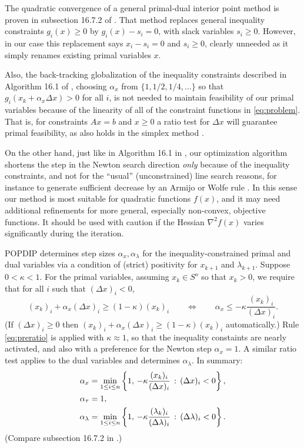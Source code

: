 \documentclass[11pt]{article}
\newcommand{\grad}{\nabla}
\begin{document}
The quadratic convergence of a general primal-dual interior point method is proven in subsection 16.7.2 of \cite{GrivaNashSofer2009}.  That method replaces general inequality constraints $g_i(x)\ge 0$ by $g_i(x) - s_i =0$, with slack variables $s_i\ge 0$.  However, in our case this replacement says $x_i-s_i=0$ and $s_i\ge 0$, clearly unneeded as it simply renames existing primal variables $x$.

Also, the back-tracking globalization of the inequality constraints described in Algorithm 16.1 of \cite{GrivaNashSofer2009}, choosing $\alpha_x$ from $\{1,1/2,1/4,\dots\}$ so that $g_i(x_k + \alpha_x \Delta x) > 0$ for all $i$, is not needed to maintain feasibility of our primal variables because of the linearity of all of the constraint functions in \eqref{eq:problem}.  That is, for constraints $Ax=b$ and $x\ge 0$ a ratio test for $\Delta x$ will guarantee primal feasibility, as also holds in the simplex method \cite[chapter 5]{GrivaNashSofer2009}.

On the other hand, just like in Algorithm 16.1 in \cite{GrivaNashSofer2009}, our optimization algorithm shortens the step in the Newton search direction \emph{only} because of the inequality constraints, and not for the ``usual'' (unconstrained) line search reasons, for instance to generate sufficient decrease by an Armijo or Wolfe rule \cite[section 11.5]{GrivaNashSofer2009}.  In this sense our method is most suitable for quadratic functions $f(x)$, and it may need additional refinements for more general, especially non-convex, objective functions.  It should be used with caution if the Hessian $\grad^2 f(x)$ varies significantly during the iteration.

POPDIP determines step sizes $\alpha_x,\alpha_\lambda$ for the inequality-constrained primal and dual variables via a condition of (strict) positivity for $x_{k+1}$ and $\lambda_{k+1}$.  Suppose $0<\kappa<1$.  For the primal variables, assuming $x_k\in S^o$ so that $x_k>0$, we require that for all $i$ such that $(\Delta x)_i < 0$,
\begin{equation}
(x_k)_i + \alpha_x (\Delta x)_i \ge (1-\kappa) (x_k)_i \qquad \iff \qquad \alpha_x \le - \kappa \frac{(x_k)_i}{(\Delta x)_i}. \label{eq:preratio}
\end{equation}
(If $(\Delta x)_i \ge 0$ then $(x_k)_i + \alpha_x (\Delta x)_i \ge (1-\kappa) (x_k)_i$ automatically.)  Rule \eqref{eq:preratio} is applied with $\kappa \approx 1$, so that the inequality constaints are nearly activated, and also with a preference for the Newton step $\alpha_x=1$.  A similar ratio test applies to the dual variables and determines $\alpha_\lambda$.  In summary:
\begin{align}
\alpha_x &= \min_{1\le i\le n} \left\{1, \,-\kappa \frac{(x_k)_i}{(\Delta x)_i} \,:\, (\Delta x)_i < 0\right\}, \label{eq:ratiotests} \\
\alpha_\tau &= 1, \notag \\
\alpha_\lambda &= \min_{1\le i\le n} \left\{1, \,-\kappa \frac{(\lambda_k)_i}{(\Delta \lambda)_i} \,:\, (\Delta \lambda)_i < 0\right\}. \notag
\end{align}
(Compare subsection 16.7.2 in \cite{GrivaNashSofer2009}.)
\end{document}
